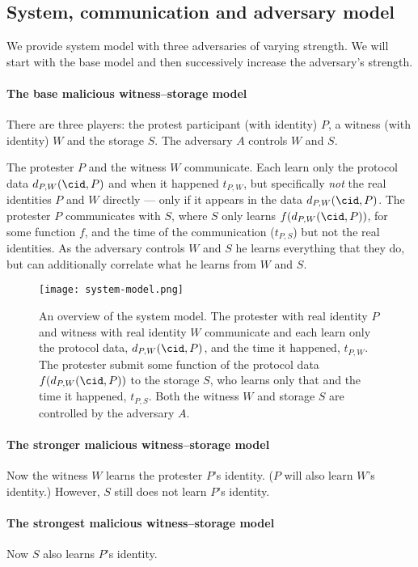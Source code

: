 \subsection{System, communication and adversary model}%
\label{adversary-model}

We provide system model with three adversaries of varying strength.
We will start with the base model and then successively increase the 
adversary's strength.

\paragraph{The base malicious witness--storage model}

There are three players: the protest participant (with identity) \(P\), a 
witness (with identity) \(W\) and the storage \(S\).
The adversary \(A\) controls \(W\) and \(S\).

The protester \(P\) and the witness \(W\) communicate.
Each learn only the protocol data \(d_{P,W}(\cid, P)\) and when it happened 
\(t_{P,W}\), but specifically \emph{not} the real identities \(P\) and \(W\) 
directly --- only if it appears in the data \(d_{P,W}(\cid, P)\).
The protester \(P\) communicates with \(S\), where \(S\) only learns 
\(f(d_{P,W}(\cid, P))\), for some function \(f\), and the time of the 
communication (\(t_{P,S}\)) but not the real identities.
As the adversary controls \(W\) and \(S\) he learns everything that they do, 
but can additionally correlate what he learns from \(W\) and \(S\).

\begin{figure}
  \centering
  \texttt{[image: system-model.png]}
  \caption{\label{fig:system-model}%
    An overview of the system model.
    The protester with real identity \(P\) and witness with real identity \(W\) 
    communicate and each learn only the protocol data, \(d_{P,W}(\cid, P)\), 
    and the time it happened, \(t_{P,W}\).
    The protester submit some function of the protocol data \(f(d_{P,W}(\cid, 
      P))\) to the storage \(S\), who learns only that and the time it 
    happened, \(t_{P,S}\).
    Both the witness \(W\) and storage \(S\) are controlled by the adversary 
    \(A\).
  }
\end{figure}

\paragraph{The stronger malicious witness--storage model}

Now the witness \(W\) learns the protester \(P\)'s identity.
(\(P\) will also learn \(W\)'s identity.)
However, \(S\) still does not learn \(P\)'s identity.

\paragraph{The strongest malicious witness--storage model}

Now \(S\) also learns \(P\)'s identity.
